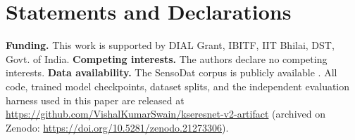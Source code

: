 \documentclass[smallextended]{svjour3}
\begin{document}
\section*{Statements and Declarations}
\textbf{Funding.} This work is supported by DIAL Grant, IBITF, IIT Bhilai,
DST, Govt. of India.
\textbf{Competing interests.} The authors declare no competing interests.
\textbf{Data availability.} The SensoDat corpus is publicly available
\citep{birchler2024sensodat}. All code, trained model checkpoints, dataset
splits, and the independent evaluation harness used in this paper are
released at \url{https://github.com/VishalKumarSwain/kseresnet-v2-artifact}
(archived on Zenodo: \url{https://doi.org/10.5281/zenodo.21273306}).
\label{sec:availability}



\end{document}
